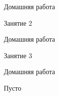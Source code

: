 \begin{homework}[number=1]
		\begin{listofex}
			\item Домашняя работа
		\end{listofex}
\end{homework}

\begin{class}[number=2]
	\begin{listofex}
		\item Занятие 2
	\end{listofex}
\end{class}

\begin{homework}[number=2]
	\begin{listofex}
		\item Домашняя работа
	\end{listofex}
\end{homework}

\begin{class}[number=3]
	\begin{listofex}
		\item Занятие 3
	\end{listofex}
\end{class}

\begin{homework}[number=3]
	\begin{listofex}
		\item Домашняя работа
	\end{listofex}
\end{homework}

\begin{class}[number=4]
	\begin{listofex}
		\item Пусто
	\end{listofex}
\end{class}
